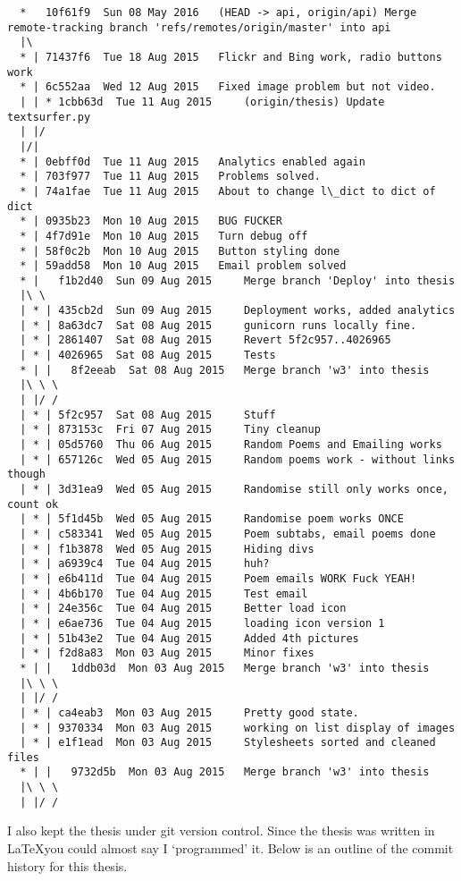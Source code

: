 {\begin{verbatim}
  *   10f61f9  Sun 08 May 2016	 (HEAD -> api, origin/api) Merge remote-tracking branch 'refs/remotes/origin/master' into api
  |\  
  * | 71437f6  Tue 18 Aug 2015	 Flickr and Bing work, radio buttons work
  * | 6c552aa  Wed 12 Aug 2015	 Fixed image problem but not video.
  | | * 1cbb63d  Tue 11 Aug 2015	 (origin/thesis) Update textsurfer.py
  | |/  
  |/|   
  * | 0ebff0d  Tue 11 Aug 2015	 Analytics enabled again
  * | 703f977  Tue 11 Aug 2015	 Problems solved.
  * | 74a1fae  Tue 11 Aug 2015	 About to change l\_dict to dict of dict
  * | 0935b23  Mon 10 Aug 2015	 BUG FUCKER
  * | 4f7d91e  Mon 10 Aug 2015	 Turn debug off
  * | 58f0c2b  Mon 10 Aug 2015	 Button styling done
  * | 59add58  Mon 10 Aug 2015	 Email problem solved
  * |   f1b2d40  Sun 09 Aug 2015	 Merge branch 'Deploy' into thesis
  |\ \  
  | * | 435cb2d  Sun 09 Aug 2015	 Deployment works, added analytics
  | * | 8a63dc7  Sat 08 Aug 2015	 gunicorn runs locally fine.
  | * | 2861407  Sat 08 Aug 2015	 Revert 5f2c957..4026965
  | * | 4026965  Sat 08 Aug 2015	 Tests
  * | |   8f2eeab  Sat 08 Aug 2015	 Merge branch 'w3' into thesis
  |\ \ \  
  | |/ /  
  | * | 5f2c957  Sat 08 Aug 2015	 Stuff
  | * | 873153c  Fri 07 Aug 2015	 Tiny cleanup
  | * | 05d5760  Thu 06 Aug 2015	 Random Poems and Emailing works
  | * | 657126c  Wed 05 Aug 2015	 Random poems work - without links though
  | * | 3d31ea9  Wed 05 Aug 2015	 Randomise still only works once, count ok
  | * | 5f1d45b  Wed 05 Aug 2015	 Randomise poem works ONCE
  | * | c583341  Wed 05 Aug 2015	 Poem subtabs, email poems done
  | * | f1b3878  Wed 05 Aug 2015	 Hiding divs
  | * | a6939c4  Tue 04 Aug 2015	 huh?
  | * | e6b411d  Tue 04 Aug 2015	 Poem emails WORK Fuck YEAH!
  | * | 4b6b170  Tue 04 Aug 2015	 Test email
  | * | 24e356c  Tue 04 Aug 2015	 Better load icon
  | * | e6ae736  Tue 04 Aug 2015	 loading icon version 1
  | * | 51b43e2  Tue 04 Aug 2015	 Added 4th pictures
  | * | f2d8a83  Mon 03 Aug 2015	 Minor fixes
  * | |   1ddb03d  Mon 03 Aug 2015	 Merge branch 'w3' into thesis
  |\ \ \  
  | |/ /  
  | * | ca4eab3  Mon 03 Aug 2015	 Pretty good state.
  | * | 9370334  Mon 03 Aug 2015	 working on list display of images
  | * | e1f1ead  Mon 03 Aug 2015	 Stylesheets sorted and cleaned files
  * | |   9732d5b  Mon 03 Aug 2015	 Merge branch 'w3' into thesis
  |\ \ \  
  | |/ /  
\end{verbatim}

\spirals

I also kept the thesis under git version control. Since the thesis was written in \LaTeX you could almost say I `programmed' it. Below is an outline of the commit history for this thesis.

}

